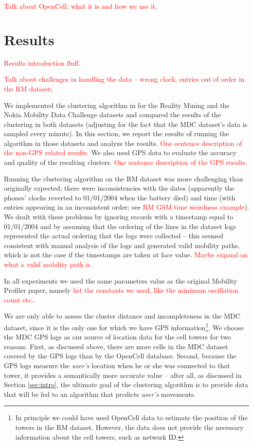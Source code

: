 \documentclass[letterpaper, 11pt, conference]{ieeeconf}
\newcommand{\xxx}[1]{\textcolor{red}{#1}}
\begin{document}
\xxx{Talk about OpenCell; what it is and how we use it.}

\section{Results}
\label{sec:results}
\xxx{Results introduction fluff.}

\xxx{Talk about challenges in handling the data -- wrong clock, entries out of order in the RM dataset;}

We implemented the clustering algorithm in \cite{mobilityprofiler} for the Reality Mining and the Nokia Mobility Data Challenge datasets and compared the results of the clustering in both datasets (adjusting for the fact that the MDC dataset's data is sampled every minute). In this section, we report the results of running the algorithm in those datasets and analyze the results. \xxx{One sentence description of the non-GPS related results.} We also used GPS data to evaluate the accuracy and quality of the resulting clusters. \xxx{One sentence description of the GPS results}.

Running the clustering algorithm on the RM dataset was more challenging than originally expected; there were inconsistencies with the dates (apparently the phones' clocks reverted to 01/01/2004 when the battery died) and time (with entries appearing in an inconsistent order; see \xxx{RM GSM time weirdness example}). We dealt with these problems by ignoring records with a timestamp equal to 01/01/2004 and by assuming that the ordering of the lines in the dataset logs represented the actual ordering that the logs were collected -- this seemed consistent with manual analysis of the logs and generated valid mobility paths, which is not the case if the timestamps are taken at face value. \xxx{Maybe expand on what a valid mobility path is.}

In all experiments we used the same parameters value as the original Mobility Profiler paper, namely \xxx{list the constants we used, like the minimum oscillation count etc.}.

We are only able to assess the cluster distance and incompleteness in the MDC dataset, since it is the only one for which we have GPS information\footnote{In principle we could have used OpenCell data to estimate the position of the towers in the RM dataset. However, the data does not provide the necessary information about the cell towers, such as network ID.}. We choose the MDC GPS logs as our source of location data for the cell towers for two reasons. First, as discussed above, there are more cells in the MDC dataset covered by the GPS logs than by the OpenCell database. Second, because the GPS logs measure the \textit{user's} location when he or she was connected to that tower, it provides a semantically more accurate value -- after all, as discussed in Section \ref{sec:intro}, the ultimate goal of the clustering algorithm is to provide data that will be fed to an algorithm that predicts \textit{user's} movements.
\end{document}
